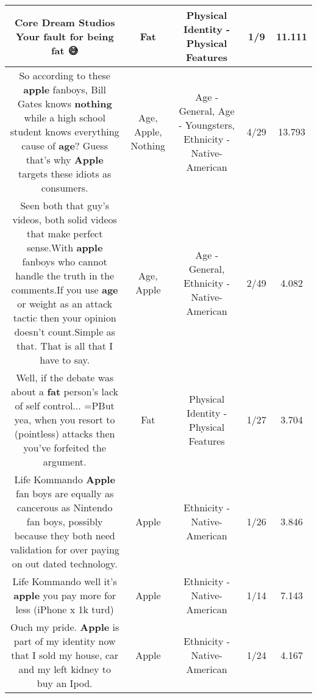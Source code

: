 \documentclass[11pt]{article}
\newlength\mylength
\begin{document}
\begin{center}
\begin{longtable}{|C{.65\mylength}|C{.30\mylength}|C{.12\mylength}|C{.12\mylength}|C{.12\mylength}|}
  \small Core Dream Studios Your fault for being \textbf{fat} 😅\normalsize   & Fat & Physical Identity - Physical Features & 1/9 & 11.111 \\  \hline
  \small So according to these \textbf{apple} fanboys, Bill Gates knows \textbf{nothing} while a high school student knows everything cause of \textbf{age}? Guess that's why \textbf{Apple} targets these idiots as consumers.\normalsize   & Age, Apple, Nothing & Age - General, Age - Youngsters, Ethnicity - Native-American & 4/29 & 13.793 \\  \hline
  \small Seen both that guy's videos, both solid videos that make perfect sense.With \textbf{apple} fanboys who cannot handle the truth in the comments.If you use \textbf{age} or weight as an attack tactic then your opinion doesn't count.Simple as that. That is all that I have to say.\normalsize   & Age, Apple & Age - General, Ethnicity - Native-American & 2/49 & 4.082 \\  \hline
  \small Well, if the debate was about a \textbf{fat} person's lack of self control... =PBut yea, when you resort to (pointless) attacks then you've forfeited the argument.\normalsize   & Fat & Physical Identity - Physical Features & 1/27 & 3.704 \\  \hline
  \small Life Kommando \textbf{Apple} fan boys are equally as cancerous as Nintendo fan boys, possibly because they both need validation for over paying on out dated technology.\normalsize   & Apple & Ethnicity - Native-American & 1/26 & 3.846 \\  \hline
  \small Life Kommando well it's \textbf{apple} you pay more for less (iPhone x 1k turd)\normalsize   & Apple & Ethnicity - Native-American & 1/14 & 7.143 \\  \hline
  \small Ouch my pride. \textbf{Apple} is part of my identity now that I sold my house, car and my left kidney to buy an Ipod.\normalsize   & Apple & Ethnicity - Native-American & 1/24 & 4.167 \\  \hline

\end{longtable}
\end{center}
\end{document}
